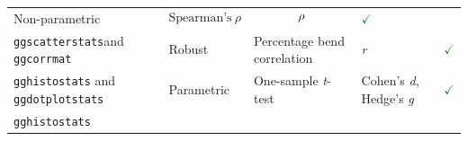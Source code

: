 \documentclass[
]{article}
\begin{document}
\begin{longtable}[]{@{}lllll@{}}
\begin{minipage}[t]{0.16\columnwidth}
Non-parametric\strut
\end{minipage} & \begin{minipage}[t]{0.31\columnwidth}\raggedright
\[\text{Spearman's}~ \rho\]\strut
\end{minipage} & \begin{minipage}[t]{0.12\columnwidth}\raggedright
\[\rho\]\strut
\end{minipage} & \begin{minipage}[t]{0.07\columnwidth}\raggedright
\textcolor{ForestGreen}{$\checkmark$}\strut
\end{minipage}\tabularnewline
\begin{minipage}[t]{0.20\columnwidth}\raggedright
\texttt{ggscatterstats}and \texttt{ggcorrmat}\strut
\end{minipage} & \begin{minipage}[t]{0.16\columnwidth}\raggedright
Robust\strut
\end{minipage} & \begin{minipage}[t]{0.31\columnwidth}\raggedright
Percentage bend correlation\strut
\end{minipage} & \begin{minipage}[t]{0.12\columnwidth}\raggedright
\emph{r}\strut
\end{minipage} & \begin{minipage}[t]{0.07\columnwidth}\raggedright
\textcolor{ForestGreen}{$\checkmark$}\strut
\end{minipage}\tabularnewline
\begin{minipage}[t]{0.20\columnwidth}\raggedright
\texttt{gghistostats} and \texttt{ggdotplotstats}\strut
\end{minipage} & \begin{minipage}[t]{0.16\columnwidth}\raggedright
Parametric\strut
\end{minipage} & \begin{minipage}[t]{0.31\columnwidth}\raggedright
One-sample \emph{t}-test\strut
\end{minipage} & \begin{minipage}[t]{0.12\columnwidth}\raggedright
Cohen's \emph{d}, Hedge's \emph{g}\strut
\end{minipage} & \begin{minipage}[t]{0.07\columnwidth}\raggedright
\textcolor{ForestGreen}{$\checkmark$}\strut
\end{minipage}\tabularnewline
\begin{minipage}[t]{0.20\columnwidth}\raggedright
\texttt{gghistostats}\strut
\end{minipage} & \begin{minipage}[t]{0.16\columnwidth}\raggedright

\end{minipage}
\end{longtable}
\end{document}
